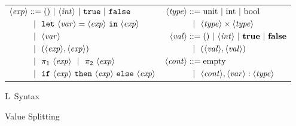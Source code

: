 \documentclass{article}
\newcommand {\bbone} {\mathbbm 1}
\newcommand {\bbtwo} {\mathbbm 2}
\newcommand {\coremono} {L}
\newcommand {\type} {\langle\mathit{type}\rangle}
\newcommand {\expr} {\langle\mathit{exp}\rangle}
\newcommand {\val} {\langle\mathit{val}\rangle}
\newcommand {\var} {\langle\mathit{var}\rangle}
\newcommand {\context} {\langle\mathit{cont}\rangle}
\newcommand {\inte} {\langle\mathit{int}\rangle}
\newcommand {\gbar} {~~|~~}
\newcommand {\letin} [3] {{\tt let}~{#1} = {#2}~{\tt in}~{#3}}
\newcommand {\ifthen} [3] {{\tt if}~{#1} ~{\tt then}~{#2}~{\tt else}~{#3}}
\newcommand {\valprod} [2] {{\bf (}{#1},{#2}{\bf )}}
\newcommand {\valnext} {{\bf next}}
\newcommand {\vsplito} {\overset{\bbone}\rightsquigarrow}
\newcommand {\vsplits} {\overset{\bbtwo}\rightsquigarrow}
\begin{document}
\begin{figure}
\caption{\coremono~Syntax}
\label{fig:baseSyntax}
\centering
\begin{tabular}{ll} 
$\begin{aligned}
\expr &::= ()~|~\inte~|~\mathtt{true}~|~\mathtt{false} \\
&\gbar \letin{\var}{\expr}{\expr} \\
&\gbar \var \\
&\gbar (\expr, \expr) \\
&\gbar \pi_1~\expr \gbar \pi_2~\expr \\
&\gbar \ifthen {\expr}{\expr}{\expr} 
\end{aligned} $
& 
$\begin{aligned}
\type &::=  \text{unit}~|~\text{int}~|~\text{bool} \\
&\gbar \type \times \type 
\\
\val &::= ()~|~\inte~|~\mathbf{true}~|~\mathbf{false} \\
&\gbar \valprod {\val} {\val} 
\\
\context &::= \mathrm{empty} \\
&\gbar \context, \var : \type
\end{aligned} $
\end{tabular}
\end{figure}


\begin{figure*}
\caption{Value Splitting}
\label{fig:valSplit}
\end{figure*}
\end{document}
